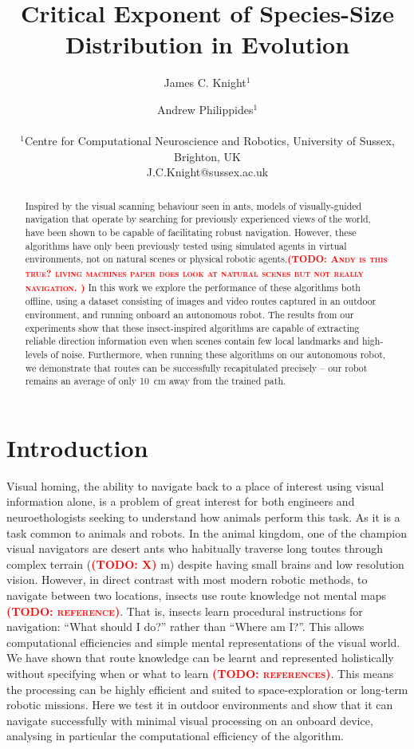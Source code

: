 \documentclass[letterpaper]{article}
\title{Critical Exponent of Species-Size Distribution in Evolution}
\author{James C. Knight$^{1}$ \and Andrew Philippides$^{1}$ \\
\mbox{}\\
$^1$Centre for Computational Neuroscience and Robotics, University of Sussex, Brighton, UK \\
J.C.Knight@sussex.ac.uk} %
\newcommand{\todo}[1]{\textbf{\textsc{\textcolor{red}{(TODO: #1)}}}}
\begin{document}
\maketitle

\begin{abstract}
Inspired by the visual scanning behaviour seen in ants, models of visually-guided navigation that operate by searching for previously experienced views of the world, have been shown to be capable of facilitating robust navigation.
However, these algorithms have only been previously tested using simulated agents in virtual environments, not on natural scenes or physical robotic agents.\todo{Andy is this true? living machines paper does look at natural scenes but not really navigation. }
In this work we explore the performance of these algorithms both offline, using a dataset consisting of images and video routes captured in an outdoor environment, and running onboard an autonomous robot.
The results from our experiments show that these insect-inspired algorithms are capable of extracting reliable direction information even when scenes contain few local landmarks and high-levels of noise.
Furthermore, when running these algorithms on our autonomous robot, we demonstrate that routes can be successfully recapitulated precisely -- our robot remains an average of only \SI{10}{\centi\metre} away from the trained path.
\end{abstract}

\section{Introduction}
Visual homing, the ability to navigate back to a place of interest using visual information alone, is a problem of great interest for both engineers and neuroethologists seeking to understand how animals perform this task. 
As it is a task common to animals and robots. 
In the animal kingdom, one of the champion visual navigators are desert ants who habitually traverse long toutes through complex terrain (\todo{X} m) despite having small brains and low resolution vision.  
However, in direct contrast with most modern robotic methods, to navigate between two locations, insects use route knowledge not mental maps \todo{reference}. 
That is, insects learn procedural instructions for navigation: ``What should I do?'' rather than ``Where am I?''. 
This allows computational efficiencies and simple mental representations of the visual world. 
We have shown that route knowledge can be learnt and represented holistically without specifying when or what to learn \todo{references}. 
This means the processing can be highly efficient and suited to space-exploration or long-term robotic missions.
Here we test it in outdoor environments and show that it can navigate successfully with minimal visual processing on an onboard device, analysing in particular the computational efficiency of the algorithm. 
\end{document}
